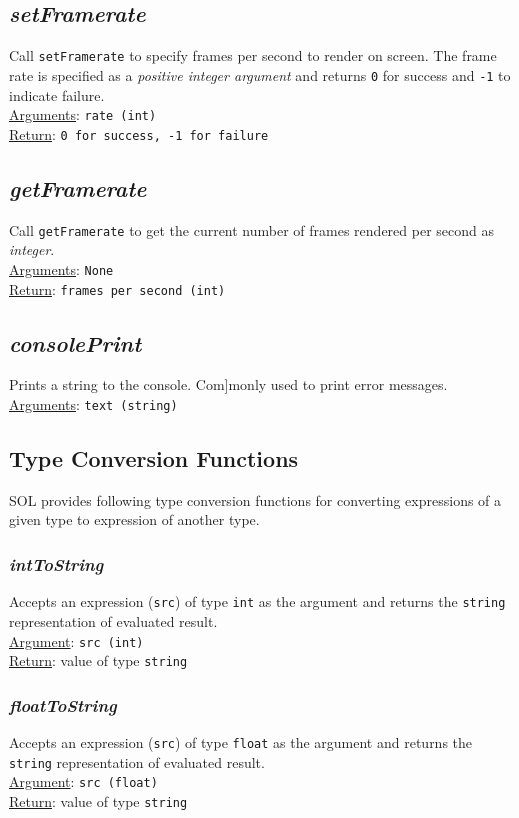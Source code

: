     \subsection{\textit{setFramerate}}
    Call \texttt{setFramerate} to specify frames per second to render on screen. The frame rate is specified as a \textit{positive integer argument} and returns \texttt{0} for success and \texttt{-1} to indicate failure.\\
    \underline{Arguments}: \texttt{rate (int)}\\
    \underline{Return}: \texttt{0 for success, -1 for failure}

    \subsection{\textit{getFramerate}}
    Call \texttt{getFramerate} to get the current number of frames rendered per second as \textit{integer}.\\
    \underline{Arguments}: \texttt{None}\\
    \underline{Return}: \texttt{frames per second (int)}

    \subsection{\textit{consolePrint}}
    Prints a string to the console. Com]monly used to print error messages.\\
    \underline{Arguments}: \texttt{text (string)}

    \subsection{Type Conversion Functions}
    SOL provides following type conversion functions for converting expressions of a given type to expression of another type.

    \subsubsection{\textit{intToString}}
    Accepts an expression (\texttt{src}) of type \texttt{int} as the argument and returns the \texttt{string} representation of evaluated result.\\
    \underline{Argument}: \texttt{src (int)}\\
    \underline{Return}: value of type \texttt{string}

    \subsubsection{\textit{floatToString}}
    Accepts an expression (\texttt{src}) of type \texttt{float} as the argument and returns the \texttt{string} representation of evaluated result.\\
    \underline{Argument}: \texttt{src (float)}\\
    \underline{Return}: value of type \texttt{string}

